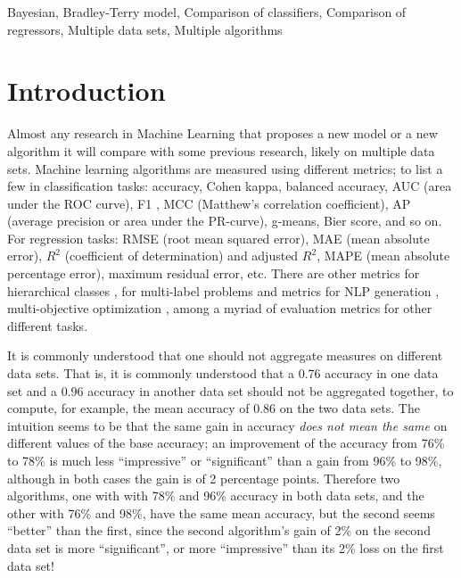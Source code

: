 \documentclass[twoside,11pt,preprint]{article}
\begin{document}
\begin{keywords}
  Bayesian,
  Bradley-Terry model,
  Comparison of classifiers,
  Comparison of regressors,
  Multiple data sets,
  Multiple algorithms
\end{keywords}

\hypertarget{introduction}{%
\section{Introduction}\label{introduction}}

Almost any research in Machine Learning that proposes a new model or a
new algorithm it will compare with some previous research, likely on
multiple data sets. Machine learning algorithms are measured using
different metrics; to list a few in classification tasks: accuracy,
Cohen kappa, balanced accuracy, AUC (area under the ROC curve), F1 ,
MCC (Matthew's correlation coefficient), AP (average precision or area
under the PR-curve), g-means, Bier score, and so on. For regression
tasks: RMSE (root mean squared error), MAE (mean absolute error),
\(R^2\) (coefficient of determination) and adjusted \(R^2\), MAPE (mean
absolute percentage error), maximum residual error, etc. There are
other metrics for hierarchical classes \citep{kosmopoulos2015evaluation},
for multi-label problems \citep{6471714} and metrics for NLP generation
\citep{Celikyilmaz20}, multi-objective optimization
\citep{riquelme2015performance}, among a myriad of evaluation metrics for
other different tasks.

It is commonly understood that one should not aggregate measures on
different data sets. That is, it is commonly understood that a 0.76
accuracy in one data set and a 0.96 accuracy in another data set
should not be aggregated together, to compute, for example, the mean
accuracy of 0.86 on the two data sets. The intuition seems to be that
the same gain in accuracy \emph{does not mean the same} on different values
of the base accuracy; an improvement of the accuracy from 76\% to 78\%
is much less ``impressive'' or ``significant'' than a gain from 96\% to
98\%, although in both cases the gain is of 2 percentage points.
Therefore two algorithms, one with with 78\% and 96\% accuracy in both
data sets, and the other with 76\% and 98\%, have the same mean
accuracy, but the second seems ``better'' than the first, since the
second algorithm's gain of 2\% on the second data set is more
``significant'', or more ``impressive'' than its 2\% loss on the first data
set!
\end{document}
